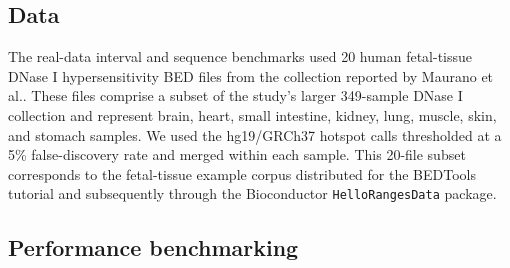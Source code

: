 \documentclass[11pt]{article}
\begin{document}
\subsection{Data}

The real-data interval and sequence benchmarks used 20 human fetal-tissue DNase I hypersensitivity BED files from the collection reported by Maurano et al.\cite{maurano2012}. These files comprise a subset of the study's larger 349-sample DNase I collection and represent brain, heart, small intestine, kidney, lung, muscle, skin, and stomach samples. We used the hg19/GRCh37 hotspot calls thresholded at a 5\% false-discovery rate and merged within each sample. This 20-file subset corresponds to the fetal-tissue example corpus distributed for the BEDTools tutorial and subsequently through the Bioconductor \texttt{HelloRangesData} package.


\subsection{Performance benchmarking}
\end{document}
